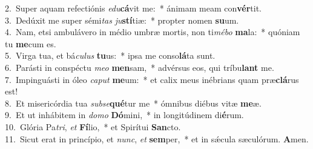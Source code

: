{2.~}Super aquam refectiónis \textit{e}\textit{du}\textbf{cá}vit me:~* ánimam meam con\textbf{vér}tit.\\
{3.~}Dedúxit me super sémi\textit{tas} \textit{ju}\textbf{stí}tiæ:~* propter nomen \textbf{su}um.\\
{4.~}Nam, etsi ambulávero in médio umbræ mortis, non ti\textit{mé}\textit{bo} \textbf{ma}la:~* quóniam tu \textbf{me}cum es.\\
{5.~}Virga tua, et bá\textit{cu}\textit{lus} \textbf{tu}us:~* ipsa me conso\textbf{lá}ta sunt.\\
{6.~}Parásti in conspéctu \textit{me}\textit{o} \textbf{men}sam,~* advérsus eos, qui tríbu\textbf{lant} me.\\
{7.~}Impinguásti in óleo \textit{ca}\textit{put} \textbf{me}um:~* et calix meus inébrians quam præ\textbf{clá}rus est!\\
{8.~}Et misericórdia tua \textit{sub}\textit{se}\textbf{qué}tur me~* ómnibus diébus vitæ \textbf{me}æ.\\
{9.~}Et ut inhábitem in \textit{do}\textit{mo} \textbf{Dó}mini,~* in longitúdinem di\textbf{é}rum.\\
{10.~}Glória Pa\textit{tri}, \textit{et} \textbf{Fí}lio,~* et Spirítui \textbf{San}cto.\\
{11.~}Sicut erat in princípio, et \textit{nunc}, \textit{et} \textbf{sem}per,~* et in sǽcula sæculórum. \textbf{A}men.\\
